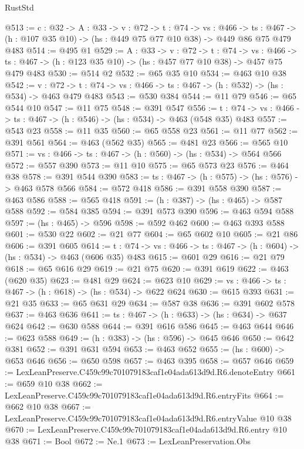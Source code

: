 \begin{lexlean}{RustStd}
\begin{coremodule}
@513 := {c : @32} ->
  {A : @33} ->
  {v : @72} ->
  {t : @74} ->
  {vs : @466} ->
  {ts : @467} -> (h : @107 @35 @10) -> (hs : @449 @75 @77 @10 @38) -> @449 @86 @75 @479 @483
@514 := @495 @1
@529 := {A : @33} ->
  {v : @72} ->
  {t : @74} ->
  {vs : @466} -> {ts : @467} -> (h : @123 @35 @10) -> (hs : @457 @77 @10 @38) -> @457 @75 @479 @483
@530 := @514 @2
@532 := @65 @35 @10
@534 := @463 @10 @38
@542 := {v : @72} ->
  {t : @74} -> {vs : @466} -> {ts : @467} -> (h : @532) -> (hs : @534) -> @463 @479 @483
@543 := @530 @384
@544 := @11 @79
@546 := @65 @544 @10
@547 := @11 @75
@548 := @391 @547
@556 := {t : @74} -> {vs : @466} -> {ts : @467} -> (h : @546) -> (hs : @534) -> @463 (@548 @35) @483
@557 := @543 @23
@558 := @11 @35
@560 := @65 @558 @23
@561 := @11 @77
@562 := @391 @561
@564 := @463 (@562 @35)
@565 := @481 @23
@566 := @565 @10
@571 := {vs : @466} -> {ts : @467} -> (h : @560) -> (hs : @534) -> @564 @566
@572 := @557 @390
@573 := @11 @10
@575 := @65 @573 @23
@576 := @464 @38
@578 := @391 @544 @390
@583 := {ts : @467} -> (h : @575) -> (hs : @576) -> @463 @578 @566
@584 := @572 @418
@586 := @391 @558 @390
@587 := @463 @586
@588 := @565 @418
@591 := (h : @387) -> (hs : @465) -> @587 @588
@592 := @584 @385
@594 := @391 @573 @390
@596 := @463 @594 @588
@597 := (hs : @465) -> @596
@598 := @592 @462
@600 := @463 @393 @588
@601 := @530 @22
@602 := @21 @77
@604 := @65 @602 @10
@605 := @21 @86
@606 := @391 @605
@614 := {t : @74} -> {vs : @466} -> {ts : @467} -> (h : @604) -> (hs : @534) -> @463 (@606 @35) @483
@615 := @601 @29
@616 := @21 @79
@618 := @65 @616 @29
@619 := @21 @75
@620 := @391 @619
@622 := @463 (@620 @35)
@623 := @481 @29
@624 := @623 @10
@629 := {vs : @466} -> {ts : @467} -> (h : @618) -> (hs : @534) -> @622 @624
@630 := @615 @393
@631 := @21 @35
@633 := @65 @631 @29
@634 := @587 @38
@636 := @391 @602 @578
@637 := @463 @636
@641 := {ts : @467} -> (h : @633) -> (hs : @634) -> @637 @624
@642 := @630 @588
@644 := @391 @616 @586
@645 := @463 @644
@646 := @623 @588
@649 := (h : @383) -> (hs : @596) -> @645 @646
@650 := @642 @381
@652 := @391 @631 @594
@653 := @463 @652
@655 := (hs : @600) -> @653 @646
@656 := @650 @598
@657 := @463 @395
@658 := @657 @646
@659 := LexLeanPreserve.C459c99c701079183caf1e04ada613d9d.R6.denoteEntry
@661 := @659 @10 @38
@662 := LexLeanPreserve.C459c99c701079183caf1e04ada613d9d.R6.entryFits
@664 := @662 @10 @38
@667 := LexLeanPreserve.C459c99c701079183caf1e04ada613d9d.R6.entryValue @10 @38
@670 := LexLeanPreserve.C459c99c701079183caf1e04ada613d9d.R6.entry @10 @38
@671 := Bool
@672 := Ne.{1}
@673 := LexLeanPreservation.Obs

\end{coremodule}
\end{lexlean}
